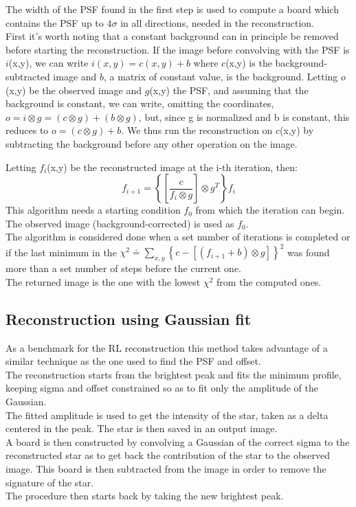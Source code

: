 \documentclass[a4paper]{article}
\begin{document}
\begin{multicols}{2}
			The width of the PSF found in the first step is used to compute a board which contains the PSF up to $4\sigma$ in all directions, needed in the reconstruction.\\
			
			First it's worth noting that a constant background can in principle be removed before starting the reconstruction. If the image before convolving with the PSF is $i$(x,y), we can write $i(x,y) = c(x,y) + b$ where $c$(x,y) is the background-subtracted image and $b$, a matrix of constant value, is the background.
			Letting $o$(x,y) be the observed image and $g$(x,y) the PSF, and assuming that the background is constant, we can write, omitting the coordinates, $o = i \otimes g = (c \otimes g) + (b \otimes g)$, but, since g is normalized and b is constant, this reduces to $o = (c \otimes g) + b$. We thus run the reconstruction on $c$(x,y) by subtracting the background before any other operation on the image.\\
			\newline
			
			Letting $f_i$(x,y) be the reconstructed image at the i-th iteration, then:
			\begin{equation*}
				f_{i+1} = \left\{\left[\frac{c}{f_i \otimes g}\right] \otimes g^T\right\}f_i
			\end{equation*}
			This algorithm needs a starting condition $f_0$ from which the iteration can begin. The observed image (background-corrected) is used as $f_0$.\\
			
			The algorithm is considered done when a set number of iterations is completed or if the last minimum in the $\chi^2 \doteq \sum_{x,y}\left\{c-\left[\left(f_{i+1} + b\right) \otimes g \right]\right\}^2$ was found more than a set number of steps before the current one.\\
			The returned image is the one with the lowest $\chi^2$ from the computed ones.
			
		\subsection{Reconstruction using Gaussian fit}
			As a benchmark for the RL reconstruction this method takes advantage of a similar technique as the one used to find the PSF and offset.\\
			
			The reconstruction starts from the brightest peak and fits the minimum profile, keeping sigma and offset constrained so as to fit only the amplitude of the Gaussian.\\
			The fitted amplitude is used to get the intensity of the star, taken as a delta centered in the peak. The star is then saved in an output image.\\
			A board is then constructed by convolving a Gaussian of the correct sigma to the reconstructed star as to get back the contribution of the star to the observed image. This board is then subtracted from the image in order to remove the signature of the star.\\
			The procedure then starts back by taking the new brightest peak.\\
			

\end{multicols}
\end{document}
